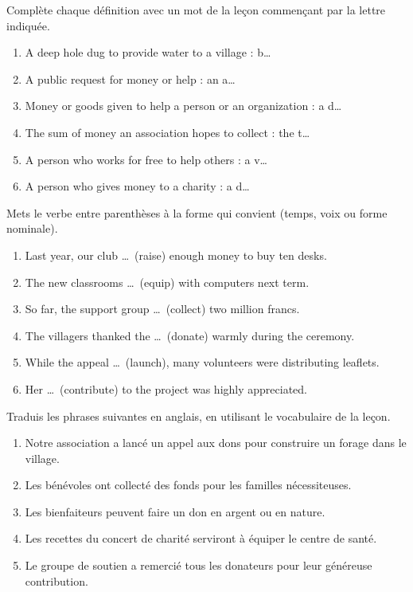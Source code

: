 \documentclass[11pt]{article}
\newcounter{popsec}
\newcounter{popsub}
\newcommand{\courssub}[1]{%
  \stepcounter{popsub}%
  \par\vspace{9pt}\noindent{\popxbold\fontsize{11.5}{13}\selectfont\color{popink}{\color{poporange}\thepopsec.\thepopsub}\hspace{6pt}#1}\par\nopagebreak\vspace{4pt}
}
\begin{document}
\begin{exercice}
Complète chaque définition avec un mot de la leçon commençant par la lettre indiquée.

\begin{enumerate}
\item A deep hole dug to provide water to a village : b\ldots
\item A public request for money or help : an a\ldots
\item Money or goods given to help a person or an organization : a d\ldots
\item The sum of money an association hopes to collect : the t\ldots
\item A person who works for free to help others : a v\ldots
\item A person who gives money to a charity : a d\ldots
\end{enumerate}
\end{exercice}

\begin{exercice}
Mets le verbe entre parenthèses à la forme qui convient (temps, voix ou forme nominale).

\begin{enumerate}
\item Last year, our club \ldots\ (raise) enough money to buy ten desks.
\item The new classrooms \ldots\ (equip) with computers next term.
\item So far, the support group \ldots\ (collect) two million francs.
\item The villagers thanked the \ldots\ (donate) warmly during the ceremony.
\item While the appeal \ldots\ (launch), many volunteers were distributing leaflets.
\item Her \ldots\ (contribute) to the project was highly appreciated.
\end{enumerate}
\end{exercice}

\courssub{Je m'entraîne}

\begin{exercice}[Traduction]
Traduis les phrases suivantes en anglais, en utilisant le vocabulaire de la leçon.

\begin{enumerate}
\item Notre association a lancé un appel aux dons pour construire un forage dans le village.
\item Les bénévoles ont collecté des fonds pour les familles nécessiteuses.
\item Les bienfaiteurs peuvent faire un don en argent ou en nature.
\item Les recettes du concert de charité serviront à équiper le centre de santé.
\item Le groupe de soutien a remercié tous les donateurs pour leur généreuse contribution.
\end{enumerate}
\end{exercice}
\end{document}
